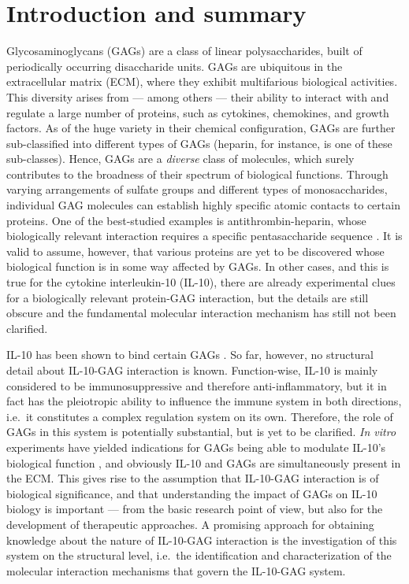 \chapter{Introduction and summary}



Glycosaminoglycans (GAGs) are a class of linear polysaccharides, built of
periodically occurring disaccharide units. GAGs are ubiquitous in the
extracellular matrix (ECM), where they exhibit multifarious biological
activities. This diversity arises from --- among others --- their ability to
interact with and regulate a large number of proteins, such as cytokines,
chemokines, and growth factors. As of the huge variety in their chemical
configuration, GAGs are further sub-classified into different types of GAGs
(heparin, for instance, is one of these sub-classes). Hence, GAGs are a
\textit{diverse} class of molecules, which surely contributes to the broadness
of their spectrum of biological functions. Through varying arrangements of
sulfate groups and different types of monosaccharides, individual GAG molecules
can establish highly specific atomic contacts to certain proteins. One of the
best-studied examples is antithrombin-heparin, whose biologically relevant
interaction requires a specific pentasaccharide sequence
\cite{antithrombin-thrombin-heparin-2004}. It is valid to assume, however, that
various proteins are yet to be discovered whose biological function is in some
way affected by GAGs. In other cases, and this is true for the cytokine
interleukin-10 (IL-10), there are already experimental clues for a biologically
relevant protein-GAG interaction, but the details are still obscure and the
fundamental molecular interaction mechanism has still not been clarified.

IL-10 has been shown to bind certain GAGs \cite{salek_ardakani_2000}. So far,
however, no structural detail about IL-10-GAG interaction is known.
Function-wise, IL-10 is mainly considered to be immunosuppressive and therefore
anti-inflammatory, but it in fact has the pleiotropic ability to influence the
immune system in both directions, i.e.\ it constitutes a complex regulation
system on its own. Therefore, the role of GAGs in this system is potentially
substantial, but is yet to be clarified. \textit{In vitro} experiments have
yielded indications for GAGs being able to modulate IL-10's biological function
\cite{salek_ardakani_2000}, and obviously IL-10 and GAGs are simultaneously
present in the ECM. This gives rise to the assumption that IL-10-GAG interaction
is of biological significance, and that understanding the impact of GAGs on
IL-10 biology is important --- from the basic research point of view, but also
for the development of therapeutic approaches. A promising approach for
obtaining knowledge about the nature of IL-10-GAG interaction is the
investigation of this system on the structural level, i.e.\ the identification
and characterization of the molecular interaction mechanisms that govern the
IL-10-GAG system.


